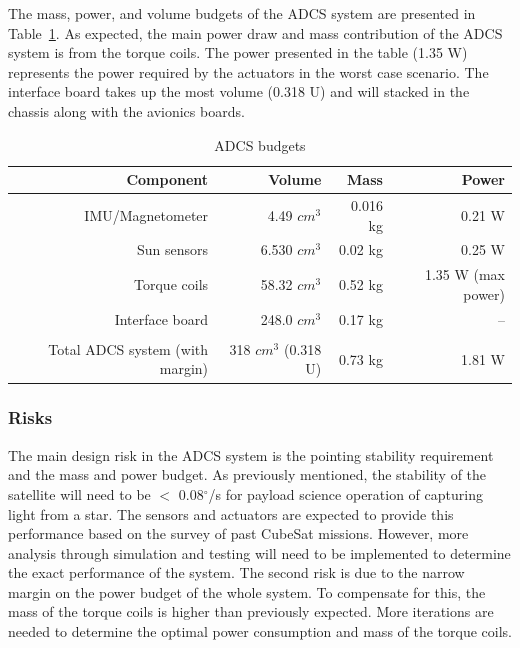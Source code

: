\documentclass[12pt]{article}
\begin{document}
			The mass, power, and volume budgets of the ADCS system are presented in Table~\ref{tab:ADCS_budget}. As expected, the main power draw and mass contribution of the ADCS system is from the torque coils. The power presented in the table (1.35 W) represents the power required by the actuators in the worst case scenario. The interface board takes up the most volume (0.318 U) and will stacked in the chassis along with the avionics boards. 
			
\begin{table}[htbp]
  \centering
  \caption{ADCS budgets}
    \begin{tabular}{|r|r|r|r|}
    \hline
    \textbf{Component} & \textbf{Volume} & \textbf{Mass} & \textbf{Power} \bigstrut\\
    \hline
    IMU/Magnetometer & 4.49 $cm^3$ & 0.016 kg & 0.21 W \bigstrut\\
    \hline
    Sun sensors & 6.530 $cm^3$ & 0.02 kg & 0.25 W \bigstrut\\
    \hline
    Torque coils & 58.32 $cm^3$ & 0.52 kg & 1.35 W (max power)\bigstrut\\
    \hline
    Interface board & 248.0 $cm^3$ & 0.17 kg & -- \bigstrut\\
    \hline
    \multicolumn{1}{r}{} & \multicolumn{1}{r}{} & \multicolumn{1}{r}{} & \multicolumn{1}{r}{} \bigstrut\\
    \hline
    Total ADCS system (with margin) & 318 $cm^3$ (0.318 U) & 0.73 kg & 1.81 W \bigstrut\\
    \hline
    \end{tabular}%
  \label{tab:ADCS_budget}%
\end{table}%


			\subsubsection{Risks}
			The main design risk in the ADCS system is the pointing stability requirement and the mass and power budget. As previously mentioned, the stability of the satellite will need to be $<$ 0.08$^\circ$/s for payload science operation of capturing light from a star. The sensors and actuators are expected to provide this performance based on the survey of past CubeSat missions. However, more analysis through simulation and testing will need to be implemented to determine the exact performance of the system. The second risk is due to the narrow margin on the power budget of the whole system. To compensate for this, the mass of the torque coils is higher than previously expected. More iterations are needed to determine the optimal power consumption and mass of the torque coils. 
\end{document}
